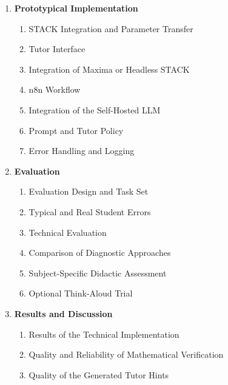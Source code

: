 \documentclass[11pt,a4paper,oneside,ngerman]{memoir}
\begin{document}
\begin{enumerate}
\begin{enumerate}
        \item Subject-Specific Scope in Differential Calculus
        \item Functional and Didactic Requirements
        \item System Architecture and Data Flow
        \item Task and Context Model
        \item PRT-Based and Dynamic Diagnosis
        \item Tutor Workflow and Hint Levels
        \item Security and Data Protection Considerations
    \end{enumerate}
    \item \textbf{Prototypical Implementation}
    \begin{enumerate}
        \item STACK Integration and Parameter Transfer
        \item Tutor Interface
        \item Integration of Maxima or Headless STACK
        \item n8n Workflow
        \item Integration of the Self-Hosted LLM
        \item Prompt and Tutor Policy
        \item Error Handling and Logging
    \end{enumerate}
    \item \textbf{Evaluation}
    \begin{enumerate}
        \item Evaluation Design and Task Set
        \item Typical and Real Student Errors
        \item Technical Evaluation
        \item Comparison of Diagnostic Approaches
        \item Subject-Specific Didactic Assessment
        \item Optional Think-Aloud Trial
    \end{enumerate}
    \item \textbf{Results and Discussion}
    \begin{enumerate}
        \item Results of the Technical Implementation
        \item Quality and Reliability of Mathematical Verification
        \item Quality of the Generated Tutor Hints

\end{enumerate}
\end{enumerate}
\end{document}
